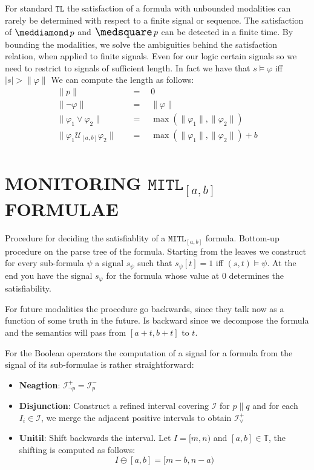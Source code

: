 \documentclass{suftesi}
\renewcommand{\b}{\textbf}
\newcommand{\TL}{$\mathtt{TL}$ }
\newcommand{\abs}[1]{\lvert #1 \rvert}
\begin{document}
For standard \TL the satisfaction of a formula with unbounded modalities can rarely be determined with respect to a finite signal or sequence. The satisfaction of $\pos p$ and $\nec p$ can be detected in a finite time.
By bounding the modalities, we solve the ambiguities behind the satisfaction relation, when applied to finite signals. Even for our logic certain signals so we need to restrict to signals of sufficient length. In fact we have that $s\vDash\varphi$ iff $\abs{s}>\|\varphi\|$ We can compute the length as follows:
\begin{align*}
    \|p\|                                       &\quad=\quad 0\\
    \|\neg\varphi\|                             &\quad=\quad \|\varphi\|\\
    \|\varphi_1\lor\varphi_2\|                  &\quad=\quad \max(\|\varphi_1\|,\|\varphi_2\|)\\
    \|\varphi_1\mathcal{U}_{[a,b]}\varphi_2\|   &\quad=\quad \max(\|\varphi_1\|,\|\varphi_2\|)+b\\
\end{align*}

\section{MONITORING $\mathtt{MITL}_{[a,b]}$ FORMULAE}

Procedure for deciding the satisfiablity of a $\mathtt{MITL}_{[a,b]}$ formula. Bottom-up procedure on the parse tree of the formula. Starting from the leaves we construct for every sub-formula $\psi$ a signal $s_\psi$ such that $s_\psi[t]=1$ iff $(s,t)\vDash\psi$. At the end you have the signal $s_\varphi$ for the formula whose value at $0$ determines the satisfiability.

For future modalities the procedure go backwards, since they talk now as a function of some truth in the future. Is backward since we decompose the formula and the semantics will pass from $[a+t,b+t]$ to $t$.

For the Boolean operators the computation of a signal for a formula from the signal of its sub-formulae is rather straightforward:

\begin{itemize} [leftmargin=0.5cm]
    \item \b{Neagtion}: $\mathcal{I}^+_{\lnot p}=\mathcal{I}^-_p$ 
    \item \b{Disjunction}: Construct a refined interval covering  $\mathcal{I}$ for $p\|q$ and for each $I_i\in\mathcal{I}$, we merge the adjacent positive intervals to obtain $\mathcal{I}^+_\lor$
    \item \b{Unitil}: Shift backwards the interval. Let $I=[m,n)$ and $[a,b]\in \mathbb{T}$, the shifting is computed as follows: $$I\ominus [a,b]=[m-b,n-a)$$
\end{itemize}
\end{document}

